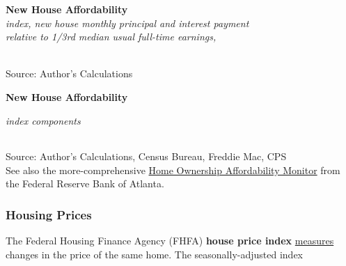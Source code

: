 \documentclass{report}
\makeatletter
\newcommand{\tbllink}[1]{\href{https://raw.githubusercontent.com/bdecon/US-chartbook/master/chartbook/data/#1}{\faTable}}
\newcommand*\short[1]{\expandafter\@gobbletwo\number\numexpr#1\relax}
\newcommand{\absnode}[3]{\node[below right, align=left] at (axis cs: #1,#2) {#3};}
\newcommand{\shdateaxisticks}{
		date coordinates in=x, axis line style={draw=none},
		xmax={2023-02-15},
		max space between ticks=40,	    
		xtick={{1990-01-01}, {1995-01-01}, {2000-01-01}, 
			{2005-01-01}, {2010-01-01}, {2015-01-01}, {2020-01-01}},
		minor xtick={},
		enlarge y limits={0.06}, enlarge x limits={0.01},
		}
\newcommand{\dbar}[2]{extra #1 ticks = {{#2}}, extra #1 tick labels = ,
		extra #1 tick style = {grid=major, grid style={dashed, thick, black!50}},}
\newcommand{\thinline}[4]{\addplot[no markers, color=#1] 
		table [x=#2, y=#3, col sep=comma] {#4};	}
\newcommand{\rbars}{
		\fill[color=black!10] (axis cs:{1990-07-01},\pgfkeysvalueof{/pgfplots/ymin}) rectangle 
			(axis cs:{1991-03-01}, \pgfkeysvalueof{/pgfplots/ymax});
		\fill[color=black!10] (axis cs:{2007-12-01},\pgfkeysvalueof{/pgfplots/ymin}) rectangle 
			(axis cs:{2009-07-01}, \pgfkeysvalueof{/pgfplots/ymax});
		\fill[color=black!10] (axis cs:{2001-03-01},\pgfkeysvalueof{/pgfplots/ymin}) rectangle 
			(axis cs:{2001-11-01}, \pgfkeysvalueof{/pgfplots/ymax});
		\fill[color=black!10] (axis cs:{2020-02-01},\pgfkeysvalueof{/pgfplots/ymin}) rectangle 
			(axis cs:{2020-05-01}, \pgfkeysvalueof{/pgfplots/ymax});}
\makeatother
\begin{document}
{\begin{minipage}{0.76\textwidth}
\begin{minipage}{0.575\textwidth}
\normalsize{\textbf{New House Affordability}}\\
\footnotesize{\textit{index, new house monthly principal and interest payment}}\\
\footnotesize{\textit{relative to 1/3rd median usual full-time earnings,}}\\
\hspace*{-2mm} \\
\footnotesize{Source: Author's Calculations} \hfill \tbllink{nha.csv}
\end{minipage} \hfill
\begin{minipage}{0.375\textwidth}
\small  
\end{minipage}
\vspace{3mm}

\normalsize \textbf{New House Affordability}\\
\footnotesize{\textit{index components}\\
\hspace*{-2mm}  \setlength{\tabcolsep}{2.0pt} \color{black!90}
		{\renewcommand{\arraystretch}{1.54}
\begin{tabular}{p{37mm} R{11mm} R{12mm} R{12mm} R{12mm}
		 		 R{12mm} R{12mm}}
			  \hline
		\end{tabular}}}

\vspace{-2mm}		
\footnotesize{Source: Author's Calculations, Census Bureau, Freddie Mac, CPS} \hfill \tbllink{nha_ts.csv} \\
\footnotesize{See also the more-comprehensive \href{https://www.atlantafed.org/center-for-housing-and-policy/data-and-tools/home-ownership-affordability-monitor}{Home Ownership Affordability Monitor} from the Federal Reserve Bank of Atlanta.}
\end{minipage}
\newpage
\subsubsection*{Housing Prices}
\begin{minipage}{0.76\textwidth}
\small The Federal Housing Finance Agency (FHFA) \textbf{house price index} \href{https://www.fhfa.gov/DataTools/Downloads/Pages/House-Price-Index-Datasets.aspx}{measures} changes in the price of the same home. The seasonally-adjusted index 


\end{minipage}}
\end{document}
